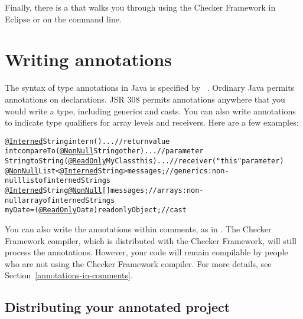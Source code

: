 Finally, there is a 
that walks you through using the Checker Framework in Eclipse or on the
command line.



\section{Writing annotations\label{writing-annotations}}

The syntax of type annotations in Java is specified by
~\cite{JSR308-2008-09-12}.  Ordinary
Java permits annotations on declarations.  JSR 308 permits annotations
anywhere that you would write a type, including generics and casts.  You
can also write annotations to indicate type qualifiers for array levels and
receivers.  Here are a few examples:

\begin{alltt}
  \underline{@Interned} String intern() \ttlcb{} ... \ttrcb{}               // return value
  int compareTo(\underline{@NonNull} String other) \ttlcb{} ... \ttrcb{}    // parameter
  String toString(\underline{@ReadOnly} MyClass this) \ttlcb{} ... \ttrcb{} // receiver ("this" parameter)
  \underline{@NonNull} List<\underline{@Interned} String> messages;       // generics:  non-null list of interned Strings
  \underline{@Interned} String \underline{@NonNull} [] messages;          // arrays:  non-null array of interned Strings
  myDate = (\underline{@ReadOnly} Date) readonlyObject;       // cast
\end{alltt}

You can also write the annotations within comments, as in
.  The Checker Framework compiler, which is
distributed with the Checker Framework, will still process
the annotations.
However, your code will remain compilable by people who are not using the
Checker Framework compiler.  For more details, see
Section~\ref{annotations-in-comments}.



\subsection{Distributing your annotated project\label{distributing}}

